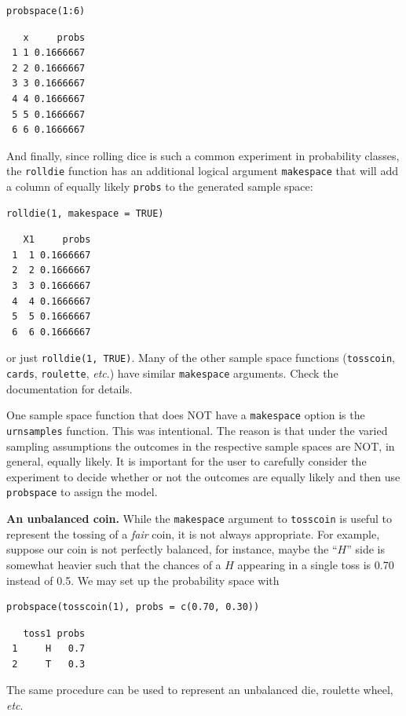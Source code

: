 \documentclass[captions=tableheading]{scrbook}
\begin{document}
\begin{example}
\begin{verbatim}
probspace(1:6)
\end{verbatim}

\begin{verbatim}
   x     probs
 1 1 0.1666667
 2 2 0.1666667
 3 3 0.1666667
 4 4 0.1666667
 5 5 0.1666667
 6 6 0.1666667
\end{verbatim}

And finally, since rolling dice is such a common experiment in probability classes, the \texttt{rolldie} function has an additional logical argument \texttt{makespace} that will add a column of equally likely \texttt{probs} to the generated sample space: 


\begin{verbatim}
rolldie(1, makespace = TRUE)
\end{verbatim}

\begin{verbatim}
   X1     probs
 1  1 0.1666667
 2  2 0.1666667
 3  3 0.1666667
 4  4 0.1666667
 5  5 0.1666667
 6  6 0.1666667
\end{verbatim}

\noindent or just \texttt{rolldie(1, TRUE)}. Many of the other sample space functions (\texttt{tosscoin}, \texttt{cards}, \texttt{roulette}, \textit{etc}.) have similar \texttt{makespace} arguments. Check the documentation for details.

\end{example}

One sample space function that does NOT have a \texttt{makespace} option is the \texttt{urnsamples} function. This was intentional. The reason is that under the varied sampling assumptions the outcomes in the respective sample spaces are NOT, in general, equally likely. It is important for the user to carefully consider the experiment to decide whether or not the outcomes are equally likely and then use \texttt{probspace} to assign the model.

\begin{example}
\label{exa:unbalanced-coin}\textbf{An unbalanced coin.} While the \texttt{makespace} argument to \texttt{tosscoin} is useful to represent the tossing of a \emph{fair} coin, it is not always appropriate. For example, suppose our coin is not perfectly balanced, for instance, maybe the ``\(H\)'' side is somewhat heavier such that the chances of a \(H\) appearing in a single toss is 0.70 instead of 0.5. We may set up the probability space with 


\begin{verbatim}
probspace(tosscoin(1), probs = c(0.70, 0.30))
\end{verbatim}

\begin{verbatim}
   toss1 probs
 1     H   0.7
 2     T   0.3
\end{verbatim}

The same procedure can be used to represent an unbalanced die, roulette wheel, \textit{etc}.

\end{example}
\end{document}
